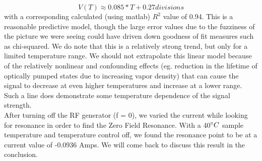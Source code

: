 \documentclass{article}
\begin{document}
\begin{equation}
      V(T) \approx 0.085*T + 0.27  divisions
\end{equation}
with a corresponding calculated (using matlab) $R^2$ value of 0.94. This is a reasonable predictive model, though the large error values due to the fuzziness of the picture we were seeing could have driven down goodness of fit measures such as chi-squared. We do note that this is a relatively strong trend, but only for a limited temperature range. We should not extrapolate this linear model because of the relatively nonlinear and confounding effects (eg. reduction in the lifetime of optically pumped states due to increasing vapor density) that can cause the signal to decrease at even higher temperatures and increase at a lower range. Such a line does demonstrate some temperature dependence of the signal strength.
\\\indent After turning off the RF generator (f = 0), we varied the current while looking for resonance in order to find the Zero Field Resonance. With a 40$\degree C$ sample temperature and temperature control off, we found the resonance point to be at a current value of -0.0936 Amps. We will come back to discuss this result in the conclusion.
\end{document}
